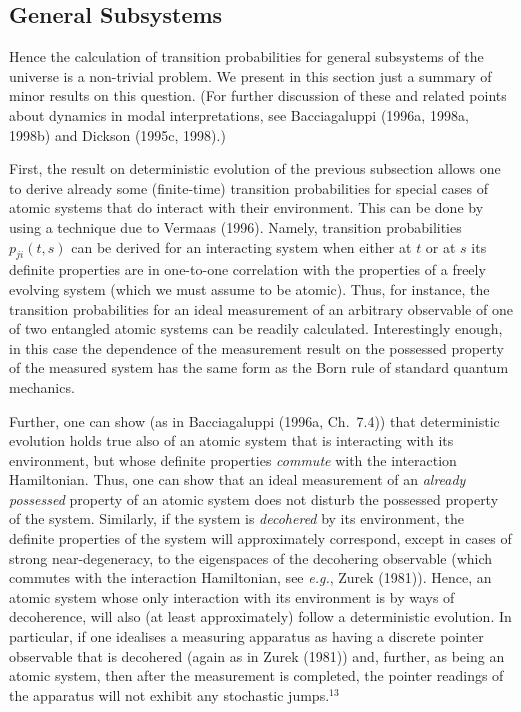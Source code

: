 \documentclass[12pt]{article}
\newcommand{\eg}{{\it e.g.}}
\begin{document}
\subsection{General Subsystems}


Hence the calculation of transition probabilities for general 
subsystems of the universe is a non-trivial problem.  We present in 
this section just a summary of minor results on this question.  (For 
further discussion of these and related points about dynamics in modal 
interpretations, see Bacciagaluppi (1996a, 1998a, 1998b) and Dickson 
(1995c, 1998).)

First, the result on deterministic evolution of the previous 
subsection allows one to derive already some (finite-time) transition 
probabilities for special cases of atomic systems that do interact 
with their environment.  This can be done by using a technique due to 
Vermaas (1996).  Namely, transition probabilities $p_{ji}(t,s)$ can be 
derived for an interacting system when either at $t$ or at $s$ its 
definite properties are in one-to-one correlation with the properties 
of a freely evolving system (which we must assume to be atomic).  
Thus, for instance, the transition probabilities for an ideal 
measurement of an arbitrary observable of one of two entangled atomic 
systems can be readily calculated.  Interestingly enough, in this case 
the dependence of the measurement result on the possessed property of 
the measured system has the same form as the Born rule of standard 
quantum mechanics.

Further, one can show (as in Bacciagaluppi (1996a, Ch.~7.4)) that 
deterministic evolution holds true also of an atomic system that is 
interacting with its environment, but whose definite properties {\em 
commute} with the interaction Hamiltonian.  Thus, one can show that an 
ideal measurement of an {\em already possessed} property of an atomic 
system does not disturb the possessed property of the system.  
Similarly, if the system is {\em decohered} by its environment, the 
definite properties of the system will approximately correspond, 
except in cases of strong near-degeneracy, to the eigenspaces of the 
decohering observable (which commutes with the interaction 
Hamiltonian, see \eg, Zurek (1981)).  Hence, an atomic system whose 
only interaction with its environment is by ways of decoherence, will 
also (at least approximately) follow a deterministic evolution.  In 
particular, if one idealises a measuring apparatus as having a 
discrete pointer observable that is decohered (again as in Zurek 
(1981)) and, further, as being an atomic system, then after the 
measurement is completed, the pointer readings of the apparatus will 
not exhibit any stochastic jumps.$^{13}$
\end{document}
